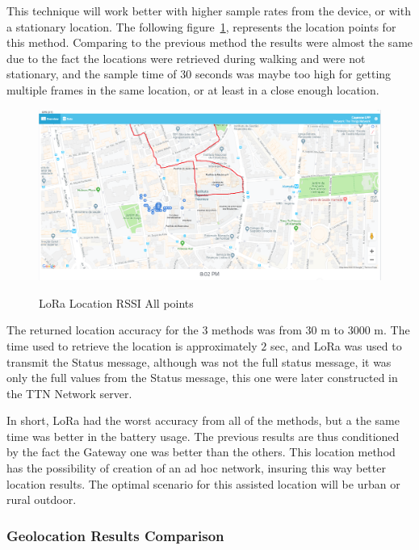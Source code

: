 This technique will work better with higher sample rates from the device, or with a stationary location. The following figure~\ref{fig:lora_geo_multiframe}, represents the location points for this method. Comparing to the previous method the results were almost the same due to the fact the locations were retrieved during walking and were not stationary, and the sample time of 30 seconds was maybe too high for getting multiple frames in the same location, or at least in a close enough location.
\begin{figure}[htbp]
  \centering
  
    {\includegraphics[width=0.8\linewidth]{Chapters/Figures/lorageores27-3.PNG}}%
 
  \caption{LoRa Location RSSI All points}
  \label{fig:lora_geo_multiframe}
\end{figure}


The returned location accuracy for the 3 methods was from  30 m to 3000 m. The time used to retrieve the location is approximately $2$ sec, and LoRa was used to transmit the Status message, although was not the full status message, it was only the full values from the Status message, this one were later constructed in the TTN Network server.

In short, LoRa had the worst accuracy from all of the methods, but a the same time was better in the battery usage. The previous results are thus conditioned by the fact the Gateway one was better than the others. This location method has the possibility of creation of an ad hoc network, insuring this way better location results. The optimal scenario for this assisted location will be urban or rural outdoor.
\newpage
\subsubsection{Geolocation Results Comparison}
\label{subsubsec:geocompare}



